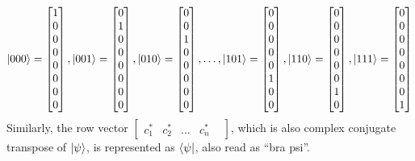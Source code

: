 \[
|000\rangle=\begin{bmatrix} 1\\ 0\\ 0\\ 0\\ 0\\ 0\\ 0\\ 0 \end{bmatrix},
|001\rangle=\begin{bmatrix} 0\\ 1\\ 0\\ 0\\ 0\\ 0\\ 0\\ 0 \end{bmatrix},
|010\rangle=\begin{bmatrix} 0\\ 0\\ 1\\ 0\\ 0\\ 0\\ 0\\ 0 \end{bmatrix},
\dots,
|101\rangle=\begin{bmatrix} 0\\ 0\\ 0\\ 0\\ 0\\ 1\\ 0\\ 0 \end{bmatrix},
|110\rangle=\begin{bmatrix} 0\\ 0\\ 0\\ 0\\ 0\\ 0\\ 1\\ 0 \end{bmatrix},
|111\rangle=\begin{bmatrix} 0\\ 0\\ 0\\ 0\\ 0\\ 0\\ 0\\ 1 \end{bmatrix}
\]
Similarly, the row vector $\begin{bmatrix} c^\ast_1 & c^\ast_2  & \dots & c^\ast_n & \end{bmatrix}$, which is also complex conjugate transpose of $|\psi\rangle$, is represented as $\langle \psi|$, also read as ``bra psi''.\medskip

